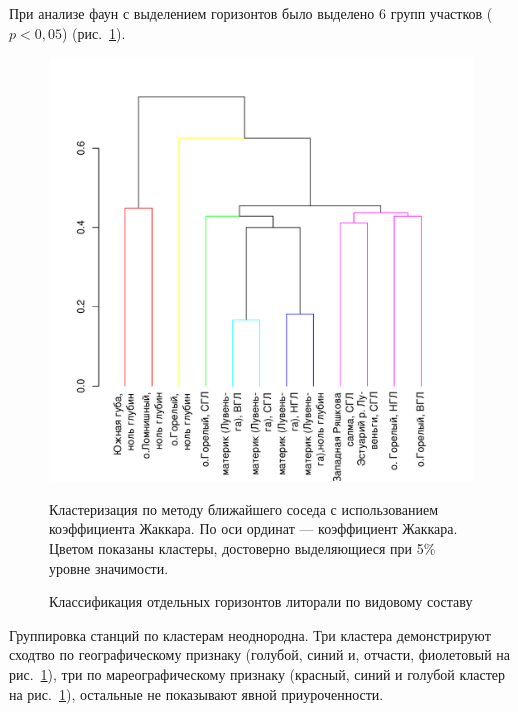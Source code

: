 При анализе фаун с выделением горизонтов было выделено 6 групп участков ($p<0,05$) (рис.~\ref{ris:cluster_white_species_tidal}). 
	\begin{figure}
		\begin{center}
			\includegraphics{../White_Sea/soobshestvo/White_fauna_tidal_jaccard_single_1.pdf}
		\end{center}
	\caption{Классификация отдельных горизонтов литорали по видовому составу}
	\label{ris:cluster_white_species_tidal}

	\footnotesize{Кластеризация по методу ближайшего соседа с использованием коэффициента Жаккара. По оси ординат --- коэффициент Жаккара. Цветом показаны кластеры, достоверно выделяющиеся при 5\% уровне значимости.}
	\end{figure}
Группировка станций по кластерам неоднородна. 
Три кластера демонстрируют сходтво по географическому признаку (голубой, синий и, отчасти, фиолетовый на рис.~\ref{ris:cluster_white_species_tidal}), три по мареографическому признаку (красный, синий и голубой кластер на рис.~\ref{ris:cluster_white_species_tidal}), остальные не показывают явной приуроченности.


